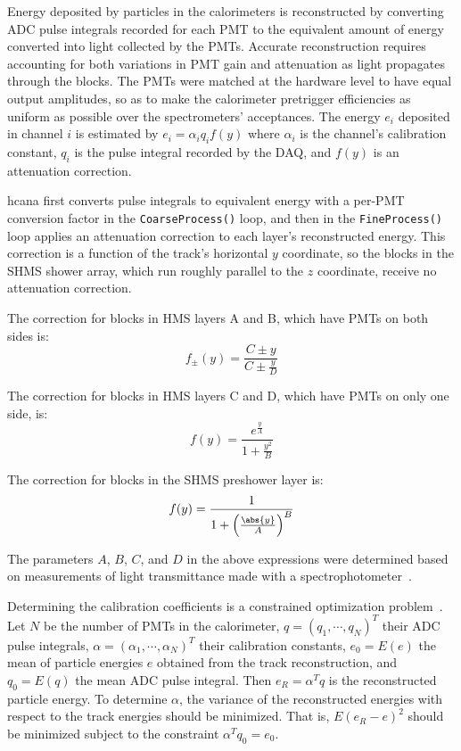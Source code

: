 Energy deposited by particles in the calorimeters is reconstructed by
converting ADC pulse integrals recorded for each PMT to
the equivalent amount of energy converted into light collected by the PMTs.
Accurate reconstruction requires accounting for both
variations in PMT gain
and
attenuation as light propagates through the blocks.
The PMTs were matched at the hardware level to have equal output amplitudes, so
as to make the calorimeter pretrigger efficiencies as uniform as possible over
the spectrometers' acceptances.
The energy $e_i$ deposited in channel $i$ is estimated by
$e_i = \alpha_i q_i f(y)$
where
$\alpha_i$ is the channel's calibration constant,
$q_i$ is the pulse integral recorded by the DAQ,
and $f(y)$ is an attenuation correction.

hcana first converts pulse integrals to equivalent energy with a
per-PMT conversion factor in the \texttt{CoarseProcess()} loop, and then
in the \texttt{FineProcess()} loop applies an attenuation correction
to each layer's reconstructed energy.
This correction is a function of the track's horizontal $y$ coordinate, so the
blocks in the SHMS shower array, which run roughly parallel to the $z$
coordinate, receive no attenuation correction.

The correction for blocks in HMS layers A and B, which have PMTs on both sides is:
\begin{equation}
    f_{\pm}(y) = \frac{C \pm y}{C \pm \frac{y}{D}}
\end{equation}

The correction for blocks in HMS layers C and D, which have PMTs on only one side, is:
\begin{equation}
    f(y) = \frac{e^{\frac{y}{A}}}{1 + \frac{y^2}{B}}
\end{equation}

The correction for blocks in the SHMS preshower layer is:
\begin{equation}
    f(y) = \frac{1}{1 + \left(\frac{\abs{y}}{A}\right)^B}
\end{equation}

The parameters $A$, $B$, $C$, and $D$ in the above expressions were determined
based on measurements of light transmittance made with a
spectrophotometer~\cite{Mkrtchyan_2012}.


Determining the calibration coefficients is a constrained optimization
problem~\cite{Amatuni, Vardan_cal_slides}.
Let $N$ be the number of PMTs in the calorimeter,
$q = (q_1, \cdots, q_N)^T$ their ADC pulse integrals,
$\alpha = (\alpha_1, \cdots, \alpha_N)^T$ their calibration constants,
$e_0 = E(e)$ the mean of particle energies $e$ obtained from the track reconstruction,
and $q_0 = E(q)$ the mean ADC pulse integral.
Then $e_R = \alpha^T q$ is the reconstructed particle energy.
To determine $\alpha$, the variance of the reconstructed energies with respect
to the track energies should be minimized.
That is, $E(e_R-e)^2$ should be minimized subject to the constraint
$\alpha^T q_0=e_0$.

